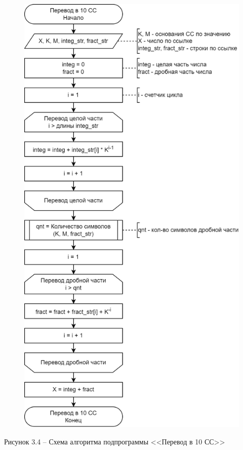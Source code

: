 \documentclass[a4paper,14pt]{extarticle}
\begin{document}
  \begin{figure}[h]
    \centering
    \includegraphics[width=0.59\linewidth]{schemes/s-3-4}
  \end{figure}
  \begin{center}
    Рисунок 3.4 – Схема алгоритма подпрограммы <<Перевод в 10 СС>>
  \end{center}
  \pagebreak
\end{document}
